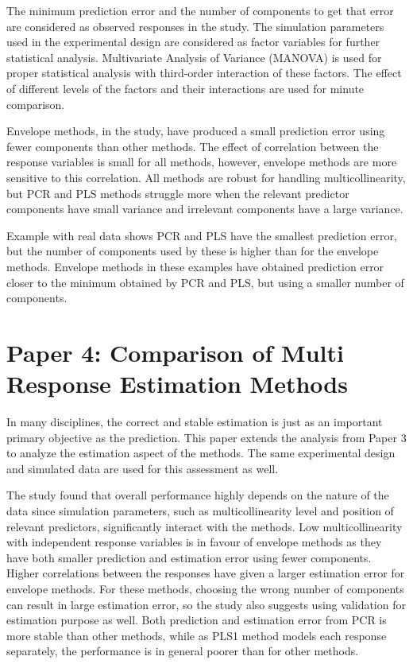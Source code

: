 \documentclass[11pt,twoside,openright,titlepage,
  headinclude,footinclude,BCOR=5mm,
  numbers=noenddot,cleardoublepage=empty,
  tablecaptionabove, dottedtoc,
  bibliography=totoc,paper=a4]{scrreprt}
\begin{document}
The minimum prediction error and the number of components to get that error are considered as observed responses in the study. The simulation parameters used in the experimental design are considered as factor variables for further statistical analysis. Multivariate Analysis of Variance (MANOVA) is used for proper statistical analysis with third-order interaction of these factors. The effect of different levels of the factors and their interactions are used for minute comparison.

Envelope methods, in the study, have produced a small prediction error using fewer components than other methods. The effect of correlation between the response variables is small for all methods, however, envelope methods are more sensitive to this correlation. All methods are robust for handling multicollinearity, but PCR and PLS methods struggle more when the relevant predictor components have small variance and irrelevant components have a large variance.

Example with real data shows PCR and PLS have the smallest prediction error, but the number of components used by these is higher than for the envelope methods. Envelope methods in these examples have obtained prediction error closer to the minimum obtained by PCR and PLS, but using a smaller number of components.

\hypertarget{paper-4-comparison-of-multi-response-estimation-methods}{%
\section{Paper 4: Comparison of Multi Response Estimation Methods}\label{paper-4-comparison-of-multi-response-estimation-methods}}

In many disciplines, the correct and stable estimation is just as an important primary objective as the prediction. This paper extends the analysis from Paper 3 to analyze the estimation aspect of the methods. The same experimental design and simulated data are used for this assessment as well.

The study found that overall performance highly depends on the nature of the data since simulation parameters, such as multicollinearity level and position of relevant predictors, significantly interact with the methods. Low multicollinearity with independent response variables is in favour of envelope methods as they have both smaller prediction and estimation error using fewer components. Higher correlations between the responses have given a larger estimation error for envelope methods. For these methods, choosing the wrong number of components can result in large estimation error, so the study also suggests using validation for estimation purpose as well. Both prediction and estimation error from PCR is more stable than other methods, while as PLS1 method models each response separately, the performance is in general poorer than for other methods.
\end{document}
